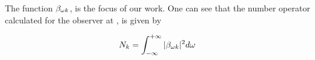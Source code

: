The function $\beta_{\omega k}$, is the focus of our work. One can see that the number operator calculated for the observer at \scrip, is given by

\begin{equation*}
    N_k=\int_{-\infty}^{+\infty}|\beta_{\omega k}|^2d\omega
\end{equation*}





 



